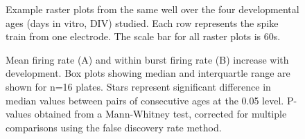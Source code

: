 \documentclass{article}
\begin{document}
\pagestyle{empty}


\makeatletter
\@fpsep\textheight
\makeatother

\begin{figure}
  \centering
  \caption{Example raster plots from the same well over the four
    developmental ages (days in vitro, DIV) studied. Each row
    represents the spike train from one electrode. The scale bar for
    all raster plots is 60s.}
\end{figure}

\begin{figure}
  \centering
  \caption{Mean firing rate (A) and within burst firing rate (B)
    increase with development.  Box plots showing median and
    interquartle range are shown for n=16 plates. Stars represent significant difference in median values between pairs of consecutive ages at the 0.05 level. P-values obtained from a Mann-Whitney test, corrected for multiple comparisons using the false discovery rate method.}
\end{figure}
\end{document}
